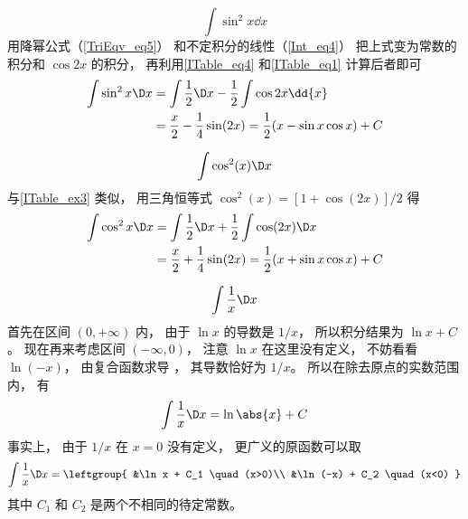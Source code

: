 \begin{exam}{}\label{ITable_ex3}
\begin{equation}
\int \sin^2 x  \dd{x}
\end{equation}
用降幂公式（\autoref{TriEqv_eq5}） 和不定积分的线性（\autoref{Int_eq4}） 把上式变为常数的积分和 $\cos 2x$ 的积分， 再利用\autoref{ITable_eq4} 和\autoref{ITable_eq1} 计算后者即可
\begin{equation}\begin{aligned}
\int \sin^2 x \D x &=  \int \frac 12 \D x - \frac 12\int \cos 2x \dd{x} \\
&=  \frac {x}{2} - \frac 14\sin(2x) = \frac 12 (x - \sin x \cos x) + C
\end{aligned}\end{equation}
\end{exam}

\begin{exam}{}\label{ITable_ex4}
\begin{equation}
\int \cos^2(x) \D x
\end{equation}
与\autoref{ITable_ex3} 类似， 用三角恒等式 $\cos^2(x) =  [1 + \cos(2x)]/2$ 得
\begin{equation}\begin{aligned}
\int \cos^2 x \D x &=  \int \frac 12 \D x + \frac 12\int \cos(2x) \D x \\
&=  \frac {x}{2} + \frac 14\sin(2x) = \frac 12 (x + \sin x \cos x) + C
\end{aligned}\end{equation}
\end{exam}

\begin{exam}{}\label{ITable_ex11}
\begin{equation}
\int \frac 1x \D x
\end{equation}
首先在区间 $(0,+\infty)$ 内， 由于 $\ln x$ 的导数是 $1/x$， 所以积分结果为 $\ln x + C$。 现在再来考虑区间 $(-\infty, 0)$， 注意 $\ln x$ 在这里没有定义， 不妨看看 $\ln(-x)$， 由复合函数求导%
， 其导数恰好为 $1/x$。 所以在除去原点的实数范围内， 有
\begin{equation}
\int \frac 1x \D x = \ln\abs{x} + C
\end{equation}
事实上， 由于 $1/x$ 在 $x=0$ 没有定义， 更广义的原函数可以取
\begin{equation}
\int \frac 1x \D x = \leftgroup{
&\ln x + C_1 \quad (x>0)\\
&\ln (-x) + C_2 \quad (x<0)
}
\end{equation}
其中 $C_1$ 和 $C_2$ 是两个不相同的待定常数。
\end{exam}

